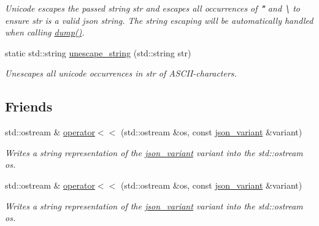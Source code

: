 \begin{DoxyCompactItemize}
\begin{DoxyCompactList}\small\item\em Unicode escapes the passed string {\ttfamily str} and escapes all occurrences of {\bfseries "} and {\bfseries \textbackslash{}} to ensure {\ttfamily str} is a valid json string. The string escaping will be automatically handled when calling \hyperlink{classJSONLIB__NAMESPACE_1_1json__variant_a72d4a39d77b76f076354219edc6ea4a0}{dump()}. \end{DoxyCompactList}\item 
static std\+::string \hyperlink{classJSONLIB__NAMESPACE_1_1json__variant_ab41402ea9062a5c4688834e734486646}{unescape\+\_\+string} (std\+::string str)
\begin{DoxyCompactList}\small\item\em Unescapes all unicode occurrences in {\ttfamily str} of A\+S\+C\+I\+I-\/characters. \end{DoxyCompactList}\end{DoxyCompactItemize}
\subsection*{Friends}
\begin{DoxyCompactItemize}
\item 
std\+::ostream \& \hyperlink{classJSONLIB__NAMESPACE_1_1json__variant_a753abbab1ca55cbb0dbb9dc9e95a4983}{operator$<$$<$} (std\+::ostream \&os, const \hyperlink{classJSONLIB__NAMESPACE_1_1json__variant}{json\+\_\+variant} \&variant)
\begin{DoxyCompactList}\small\item\em Writes a string representation of the \hyperlink{classJSONLIB__NAMESPACE_1_1json__variant}{json\+\_\+variant} {\ttfamily variant} into the std\+::ostream {\ttfamily os}. \end{DoxyCompactList}\item 
std\+::ostream \& \hyperlink{classJSONLIB__NAMESPACE_1_1json__variant_a753abbab1ca55cbb0dbb9dc9e95a4983}{operator$<$$<$} (std\+::ostream \&os, const \hyperlink{classJSONLIB__NAMESPACE_1_1json__variant}{json\+\_\+variant} \&variant)
\begin{DoxyCompactList}\small\item\em Writes a string representation of the \hyperlink{classJSONLIB__NAMESPACE_1_1json__variant}{json\+\_\+variant} {\ttfamily variant} into the std\+::ostream {\ttfamily os}. \end{DoxyCompactList}\end{DoxyCompactItemize}


